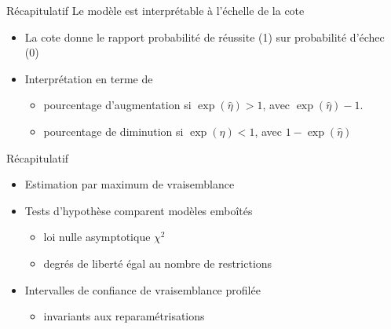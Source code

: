 \documentclass[
  ignorenonframetext,
]{beamer}
\providecommand{\tightlist}{%
  \setlength{\itemsep}{0pt}\setlength{\parskip}{0pt}}\usepackage{longtable,booktabs,array}
\begin{document}
\begin{frame}{Récapitulatif}
\protect\hypertarget{ruxe9capitulatif-1}{}
Le modèle est interprétable à l'échelle de la cote

\begin{itemize}
\tightlist
\item
  La cote donne le rapport probabilité de réussite (1) sur probabilité
  d'échec (0)
\item
  Interprétation en terme de

  \begin{itemize}
  \tightlist
  \item
    pourcentage d'augmentation si \(\exp(\widehat{\eta}) > 1\), avec
    \(\exp(\widehat{\eta})-1\).
  \item
    pourcentage de diminution si \(\exp(\widehat{\eta}) < 1\), avec
    \(1-\exp(\widehat{\eta})\)
  \end{itemize}
\end{itemize}
\end{frame}

\begin{frame}{Récapitulatif}
\protect\hypertarget{ruxe9capitulatif-2}{}
\begin{itemize}
\tightlist
\item
  Estimation par maximum de vraisemblance
\item
  Tests d'hypothèse comparent modèles emboîtés

  \begin{itemize}
  \tightlist
  \item
    loi nulle asymptotique \(\chi^2\)
  \item
    degrés de liberté égal au nombre de restrictions
  \end{itemize}
\item
  Intervalles de confiance de vraisemblance profilée

  \begin{itemize}
  \tightlist
  \item
    invariants aux reparamétrisations
  \end{itemize}
\end{itemize}
\end{frame}
\end{document}
